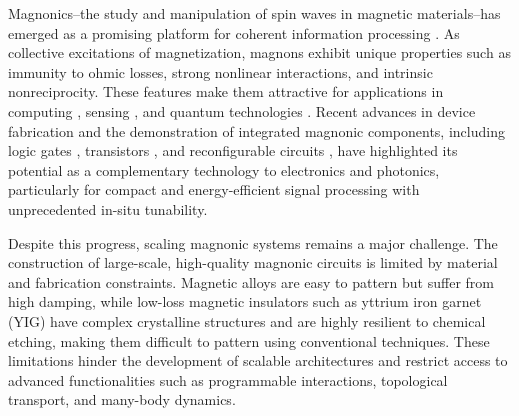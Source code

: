 \documentclass[
twocolumn,

superscriptaddress,









 amsmath,amssymb,
 aps,


prl,




]{revtex4-2}
\begin{document}
\maketitle
















Magnonics--the study and manipulation of spin waves in magnetic materials--has emerged as a promising platform for coherent information processing \cite{HybridmagnonicsLi,QuantumEngineeringWithHybridMagnonic,BHOI202039,HARDER201847,Lachance-Quirion_2019, Chumak2019MagnonSpintronics, flebus_2024_2024,ZARERAMESHTI20221,Areviewofcommonmaterials,StronglyCoupledMagnons,StrongFieldInteractionsSoykal,High-CooperativityCavity,Magneto-opticalcouplingHaigh,Cavitymagnomechanics}. As collective excitations of magnetization, magnons exhibit unique properties such as immunity to ohmic losses, strong nonlinear interactions, and intrinsic nonreciprocity. These features make them attractive for applications in computing \cite{wang_magnonic_2020,zenbaa_universal_2025,AdvancesinMagneticsRoadmap,meta-learningZhang,korber_pattern_2023,yaremkevich_-chip_2023}, sensing \cite{flower_broadening_2019,AxionSearchCrescini,DetectingLightDarkMatterwithMagnons,chang_mosaic_2025,barry_ferrimagnetic_2023,matatagui_magnonic_2017,silva_biosensor_2024}, and quantum technologies \cite{HighCooperativityHuebl,Resolvingquantaofcollectivespin,Entanglement-basedsingle-shot,HybridizingFerromagneticMagnonsTabuchi,CoherentCouplingTabuchi,QuantumControlXu,Dissipation-BasedWolski}. Recent advances in device fabrication \cite{rashedi_photonic_2025,MonocrystallineFreestandingHeyroth,trempler_integration_2020,baity_strong_2021} and the demonstration of integrated magnonic components, including logic gates \cite{inverse-designZenbaa}, transistors \cite{chumak_magnon_2014}, and reconfigurable circuits \cite{zenbaa_universal_2025}, have highlighted its potential as a complementary technology to electronics and photonics, particularly for compact and energy-efficient signal processing with unprecedented in-situ tunability.

Despite this progress, scaling magnonic systems remains a major challenge. The construction of large-scale, high-quality magnonic circuits is limited by material and fabrication constraints. Magnetic alloys are easy to pattern but suffer from high damping, while low-loss magnetic insulators such as yttrium iron garnet (YIG) have complex crystalline structures and are highly resilient to chemical etching, making them difficult to pattern using conventional techniques. These limitations hinder the development of scalable architectures and restrict access to advanced functionalities such as programmable interactions, topological transport, and many-body dynamics.
\end{document}
